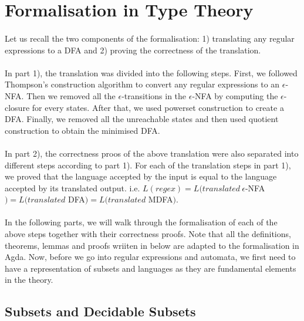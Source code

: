 \section{Formalisation in Type Theory}
\paragraph{} Let us recall the two components of the formalisation: 1) translating any
regular expressions to a DFA and 2) proving the correctness of the
translation. 

\paragraph{} In part 1), the translation was divided into the following steps. First, we
followed Thompson's construction algorithm to convert any regular expressions to an
\(\epsilon\)-NFA. Then we removed all the \(\epsilon\)-transitions in
the \(\epsilon\)-NFA by computing the \(\epsilon\)-closure for every states. After that, we used powerset
construction to create a DFA. Finally, we removed all the unreachable
states and then used quotient construction to obtain the minimised
DFA. 

\paragraph{} In part 2), the correctness proos of the above
translation were also separated into different steps according to part
1). For each of the translation steps in part 1), we proved
that the language accepted by the input is equal to the language
accepted by its translated output. i.e. \(L(regex) =
L(translated\ \epsilon\)-NFA\() = L(translated\) DFA\() =
L(translated\) MDFA\()\). 

\paragraph{} In the following parts, we will walk through the formalisation of
each of the above steps together with their correctness proofs. Note
that all the definitions, theorems, lemmas and proofs wriiten in below
are adapted to the formalisation in Agda. Now, before we go into
regular expressions and automata, we first need to have a
representation of subsets and languages as they are fundamental
elements in the theory. 

\subsection{Subsets and Decidable Subsets}

